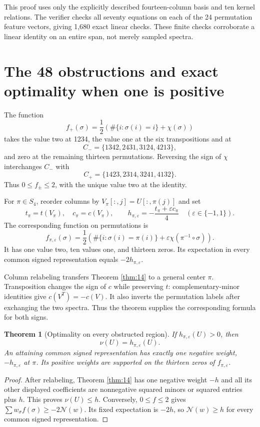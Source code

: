 \documentclass[11pt,a4paper]{article}
\newtheorem{theorem}{Theorem}[section]
\newcommand{\eps}{\varepsilon}
\begin{document}
This proof uses only the explicitly described fourteen-column basis and ten kernel relations. The verifier checks all seventy equations on each of the 24 permutation feature vectors, giving 1,680 exact linear checks. These finite checks corroborate a linear identity on an entire span, not merely sampled spectra.

\section{The 48 obstructions and exact optimality when one is positive}
The function
\[
f_+(\sigma)=\frac12\left(\#\{i:\sigma(i)=i\}+\chi(\sigma)\right)
\]
takes the value two at 1234, the value one at the six transpositions and at
\[
C_- =\{1342,2431,3124,4213\},
\]
and zero at the remaining thirteen permutations. Reversing the sign of $\chi$ interchanges $C_-$ with
\[
C_+ =\{1423,2314,3241,4132\}.
\]
Thus $0\le f_\pm\le2$, with the unique value two at the identity.

For $\pi\in S_4$, reorder columns by $V_\pi[:,j]=U[:,\pi(j)]$ and set
\[
t_\pi=t(V_\pi),\quad c_\pi=c(V_\pi),\qquad
h_{\pi,\eps}=-\frac{t_\pi+\eps c_\pi}{4}\quad(\eps\in\{-1,1\}).
\]
The corresponding function on permutations is
\[
f_{\pi,\eps}(\sigma)=\frac12\left(\#\{i:\sigma(i)=\pi(i)\}
+\eps\chi(\pi^{-1}\circ\sigma)\right).
\]
It has one value two, ten values one, and thirteen zeros. Its expectation in every common signed representation equals $-2h_{\pi,\eps}$.

Column relabeling transfers Theorem \ref{thm:14} to a general center $\pi$. Transposition changes the sign of $c$ while preserving $t$: complementary-minor identities give $c(V^T)=-c(V)$. It also inverts the permutation labels after exchanging the two spectra. Thus the theorem supplies the corresponding formula for both signs.

\begin{theorem}[Optimality on every obstructed region]\label{thm:optimal}
If $h_{\pi,\eps}(U)>0$, then
\[
\nu(U)=h_{\pi,\eps}(U).
\]
An attaining common signed representation has exactly one negative weight, $-h_{\pi,\eps}$ at $\pi$. Its positive weights are supported on the thirteen zeros of $f_{\pi,\eps}$.
\end{theorem}
\begin{proof}
After relabeling, Theorem \ref{thm:14} has one negative weight $-h$ and all its other displayed coefficients are nonnegative squared minors or squared entries plus $h$. This proves $\nu(U)\le h$. Conversely, $0\le f\le2$ gives $\sum w_\sigma f(\sigma)\ge-2\mathcal N(w)$. Its fixed expectation is $-2h$, so $\mathcal N(w)\ge h$ for every common signed representation.
\end{proof}
\end{document}
